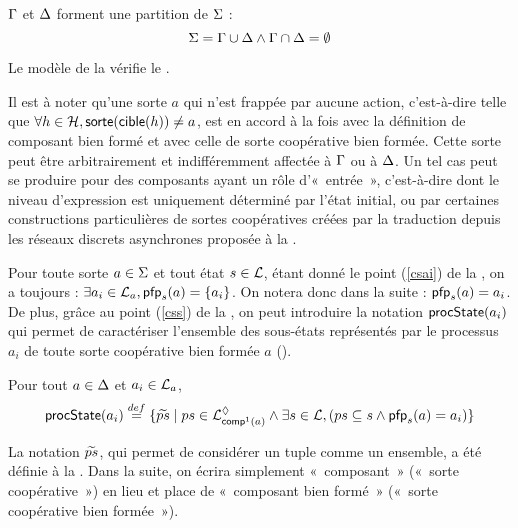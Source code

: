 \begin{critere}
  $\components$ et $\cs$ forment une partition de $\PHs$ :
  \[\PHs = \components \cup \cs \wedge \components \cap \cs = \emptyset\]
\end{critere}

\begin{example}
  Le modèle de la  vérifie le .
\end{example}



Il est à noter qu'une sorte $a$ qui n'est frappée par aucune action,
c'est-à-dire telle que $\forall h \in \PHh, \sort{\target{h}} \neq a$,
est en accord à la fois avec la définition de composant bien formé
et avec celle de sorte coopérative bien formée.
Cette sorte peut être arbitrairement et indifféremment affectée à $\components$ ou à $\cs$.
Un tel cas peut se produire pour des composants ayant un rôle d'«~entrée~»,
c'est-à-dire dont le niveau d'expression est uniquement déterminé par l'état initial,
ou par certaines constructions particulières de sortes coopératives créées par la traduction
depuis les réseaux discrets asynchrones proposée à la .

Pour toute sorte $a \in \PHs$ et tout état $s \in \PHl$,
étant donné le point (\ref{csai}) de la , on a toujours :
$\exists a_i \in \PHl_a, \pfp_s(a) = \{ a_i \}$.
On notera donc dans la suite : $\pfp_s(a) = a_i$.
De plus, grâce au point (\ref{css}) de la , on peut introduire la notation
$\csState(a_i)$ qui permet de caractériser l'ensemble des sous-états représentés par le
processus $a_i$ de toute sorte coopérative bien formée $a$ ().

\begin{definition}[$\csState : \PHproc \rightarrow \powerset(\PHproc)$]
\label{def:csState}
  Pour tout $a \in \cs$ et $a_i \in \PHl_a$, 
    \[\csState(a_i) \DEF \{ \toset{ps} \mid ps \in \PHsubl[\PHl]_{\compin(a)} \wedge
      \exists s \in \PHl, (ps \subseteq s \wedge \pfp_s(a) = a_i) \}\]
\end{definition}

La notation $\toset{ps}$,
qui permet de considérer un tuple comme un ensemble,
a été définie à la .
Dans la suite, on écrira simplement «~composant~» (\resp «~sorte coopérative~»)
en lieu et place de «~composant bien formé~» (\resp «~sorte coopérative bien formée~»).

